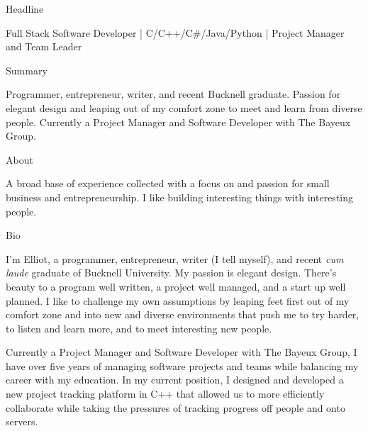 \documentclass{resume} %
\begin{document}

\begin{rSection}{Headline}

Full Stack Software Developer | C/C++/C#/Java/Python | Project Manager and Team Leader \\

\end{rSection}


\begin{rSection}{Summary}

Programmer, entrepreneur, writer, and recent Bucknell graduate. Passion for elegant design and leaping out of my comfort zone to meet and learn from diverse people. Currently a Project Manager and Software Developer with The Bayeux Group.

\end{rSection}

\begin{rSection}{About}

A broad base of experience collected with a focus on and passion for small business and entrepreneurship. I like building interesting things with interesting people. 

\end{rSection}


\begin{rSection}{Bio}

I'm Elliot, a programmer, entrepreneur, writer (I tell myself), and recent \textit{cum laude} graduate of Bucknell University. My passion is elegant design. There's beauty to a program well written, a project well managed, and a start up well planned.  I like to challenge my own assumptions by leaping feet first out of my comfort zone and into new and diverse environments that push me to try harder, to listen and learn more, and to meet interesting new people.

Currently a Project Manager and Software Developer with The Bayeux Group, I have over five years of managing software projects and teams while balancing my career with my education. In my current position, I designed and developed a new project tracking platform in C++ that allowed us to more efficiently collaborate while taking the pressures of tracking progress off people and onto servers.

\end{rSection}
\end{document}

